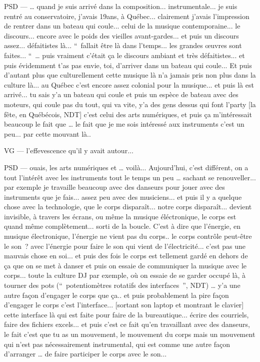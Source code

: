PSD — … quand je suis arrivé dans la composition... instrumentale... je suis rentré au conservatoire, j'avais 19ans, à Québec... clairement j'avais l'impression de rentrer dans un bateau qui coule... celui de la musique contemporaine... le discours... encore avec le poids des vieilles avant-gardes... et puis un discours assez... défaitistes là... “ fallait être là dans l'temps... les grandes œuvres sont faites... “ … puis vraiment c'était ça le discours ambiant et très défaitistes... et puis évidemment t'as pas envie, toi, d'arriver dans un bateau qui coule... Et puis d'autant plus que culturellement cette musique là n'a jamais pris non plus dans la culture là... au Québec c'est encore assez colonial pour la musique... et puis là est arrivé... tu sais y'a un bateau qui coule et puis un espèce de bateau avec des moteurs, qui coule pas du tout, qui va vite, y'a des gens dessus qui font l'party [la fête, en Québécois, NDT] c'est celui des arts numériques, et puis ça m'intéressait beaucoup le fait que … le fait que je me sois intéressé aux instruments c'est un peu... par cette mouvant là.. 

VG — l'effevescence qu'il y avait autour... 

PSD — ouais, les arts numériques et … voilà... Aujourd'hui, c'est différent, on a tout l'intérêt avec les instruments tout le temps un peu  … sachant se renouveller... par exemple je travaille beaucoup avec des danseurs pour jouer avec des instruments que je fais... assez peu avec des musiciens... et puis il y a quelque chose avec la technologie, que le corps disparaît... notre corps disparaît... devient invisible, à travers les écrans, ou même la musique éléctronique, le corps est quand même complètement... sorti de la boucle. C'est à dire que l'énergie, en musique électronique, l'énergie ne vient pas du corps.. le corps contrôle peut-être le son ? avec l'énergie pour faire le son qui vient de l'électricité... c'est pas une mauvais chose en soi... et puis des fois le corps est tellement gardé en dehors de ça que on se met à danser et puis on essaie de communiquer la musique avec le corps... toute la culture DJ par exemple, où on essaie de se garder occupé là, à tourner des pots (“ potentiomètres rotatifs des interfaces ”, NDT) … y'a une autre façon d'engager le corps que ça.. et puis probablement la pire façon d'engager le corps c'est l'interface... [sortant son laptop et montrant le clavier] cette interface là qui est faite pour faire de la bureautique... écrire des courriels, faire des  fichiers excels... et puis c'est ce fait qu'en travaillant avec des danseurs, le fait c'est que tu as un mouvement, le mouvement du corps mais un mouvement qui n'est pas nécessairement instrumental, qui est comme une autre façon d'arranger … de faire participer le corps avec le son... 

